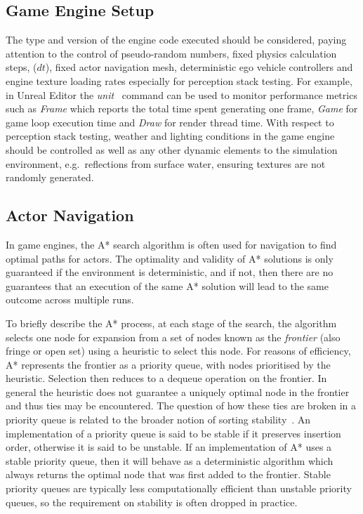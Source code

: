 \subsection{Game Engine Setup}
The type and version of the engine code executed should be considered, paying attention to the control of pseudo-random numbers, fixed physics calculation steps, ($dt$), fixed actor navigation mesh, deterministic ego vehicle controllers and engine texture loading rates especially for perception stack testing. 
%
For example, in Unreal Editor the \textit{unit}~\cite{stat_commands} command can be used to monitor performance metrics such as \textit{Frame} which reports the total time spent generating one frame, \textit{Game} for game loop execution time and \textit{Draw} for render thread time. 
%
With respect to perception stack testing, weather and lighting conditions in the game engine should be controlled as well as any other dynamic elements to the simulation environment, e.g.\ reflections from surface water, ensuring textures are not randomly generated. 

\subsection{Actor Navigation}
%
In game engines, the A* search algorithm is often used for navigation to find optimal paths for actors. 
%
The optimality and validity of A* solutions is only guaranteed if the environment is deterministic, and if not, then there are no guarantees that an execution of the same A* solution will lead to the same outcome across multiple runs. 

To briefly describe the A* process, at each stage of the search, the algorithm selects one node for expansion from a set of nodes known as the \textit{frontier} (also fringe or open set) using a heuristic to select this node. For reasons of efficiency, A* represents the frontier as a priority queue, with nodes prioritised by the heuristic. Selection then reduces to a dequeue operation on the frontier. In general the heuristic does not guarantee a uniquely optimal node in the frontier and thus ties may be encountered. The question of how these ties are broken in a priority queue is related to the broader notion of sorting stability~\cite{Sedgewick2011}. An implementation of a priority queue is said to be stable if it preserves insertion order, otherwise it is said to be unstable. If an implementation of A* uses a stable priority queue, then it will behave as a deterministic algorithm which always returns the optimal node that was first added to the frontier. Stable priority queues are typically less computationally efficient than unstable priority queues, so the requirement on stability is often dropped in practice. 

